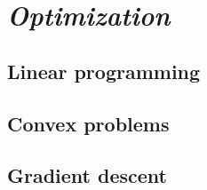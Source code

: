 \chapter{\emph{Optimization}} 
\label{optimization}


\section{Linear programming}
\section{Convex problems}
\section{Gradient descent}








